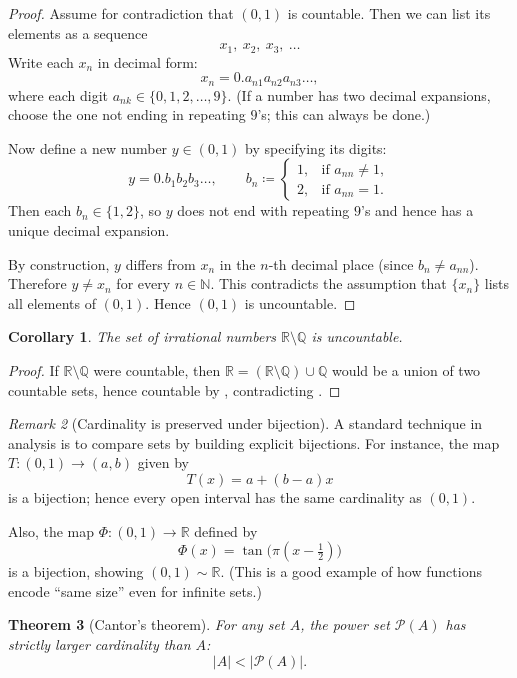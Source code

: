 \documentclass[12pt]{article}
\numberwithin{equation}{section}
\def\abs#1{|#1|}
\newcommand{\RR}{\mathbb{R}}
\newcommand{\QQ}{\mathbb{Q}}
\newcommand{\NN}{\mathbb{N}}
\DeclarePairedDelimiter{\abs}{\lvert}{\rvert}
\newcommand{\casesm}[1]{\begin{cases}#1\end{cases}}
\theoremstyle{plain}
\newtheorem{theorem}{Theorem}[section]
\newtheorem{corollary}[theorem]{Corollary}
\theoremstyle{definition}
\theoremstyle{remark}
\newtheorem{remark}[theorem]{Remark}
\begin{document}
\begin{proof}
Assume for contradiction that $(0,1)$ is countable. Then we can list its elements as a sequence
\[
x_1,\ x_2,\ x_3,\ \dots
\]
Write each $x_n$ in decimal form:
\[
x_n = 0.a_{n1}a_{n2}a_{n3}\dots,
\]
where each digit $a_{nk}\in\{0,1,2,\dots,9\}$. (If a number has two decimal expansions, choose the one not ending in repeating $9$'s; this can always be done.)

Now define a new number $y\in(0,1)$ by specifying its digits:
\[
y = 0.b_1b_2b_3\dots,
\qquad
b_n \coloneqq
\casesm{
1, & \text{if } a_{nn}\neq 1,\\
2, & \text{if } a_{nn}=1.
}
\]
Then each $b_n\in\{1,2\}$, so $y$ does not end with repeating $9$'s and hence has a unique decimal expansion.

By construction, $y$ differs from $x_n$ in the $n$-th decimal place (since $b_n\neq a_{nn}$). Therefore $y\neq x_n$ for every $n\in\NN$.  
This contradicts the assumption that $\{x_n\}$ lists all elements of $(0,1)$. Hence $(0,1)$ is uncountable.
\end{proof}

\begin{corollary}\label{cor:irrational-uncountable}
The set of irrational numbers $\RR\setminus\QQ$ is uncountable.
\end{corollary}

\begin{proof}
If $\RR\setminus\QQ$ were countable, then $\RR=(\RR\setminus\QQ)\cup\QQ$ would be a union of two countable sets, hence countable by , contradicting .
\end{proof}

\begin{remark}[Cardinality is preserved under bijection]
A standard technique in analysis is to compare sets by building explicit bijections.
For instance, the map $T:(0,1)\to (a,b)$ given by
\[
T(x)=a+(b-a)x
\]
is a bijection; hence every open interval has the same cardinality as $(0,1)$.

Also, the map $\Phi:(0,1)\to\RR$ defined by
\[
\Phi(x)=\tan\bigl(\pi(x-\tfrac12)\bigr)
\]
is a bijection, showing $(0,1)\sim \RR$. (This is a good example of how functions encode ``same size'' even for infinite sets.)
\end{remark}

\begin{theorem}[Cantor's theorem]\label{thm:cantor-power}
For any set $A$, the power set $\mathcal{P}(A)$ has strictly larger cardinality than $A$:
\[
\abs{A} < \abs{\mathcal{P}(A)}.
\]
\end{theorem}
\end{document}
